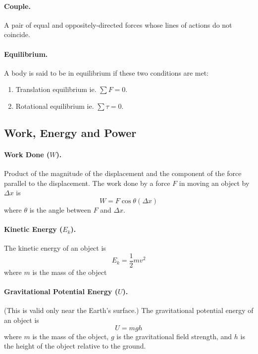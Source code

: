 \documentclass{article}
\begin{document}
\paragraph{Couple.} A pair of equal and oppositely-directed forces whose lines
of actions do not coincide.

\paragraph{Equilibrium.} A body is said to be in equilibrium if these two
conditions are met:

\begin{enumerate} \item Translation equilibrium ie. $\sum F = 0$.  \item
Rotational equilibrium ie. $\sum \tau = 0$.  \end{enumerate}

\subsection{Work, Energy and Power}

\paragraph{Work Done ($W$).} Product of the magnitude of the displacement and
the component of the force parallel to the displacement. The work done by a
force $F$ in moving an object by $\Delta x$ is \begin{equation} W =
  F\cos\theta(\Delta x) \end{equation} where $\theta$ is the angle between $F$
  and $\Delta x$.

\paragraph{Kinetic Energy ($E_k$).} The kinetic energy of an object is
\begin{equation} E_k = \frac{1}{2}mv^2 \end{equation} where $m$ is the mass of
  the object

\paragraph{Gravitational Potential Energy ($U$).} (This is valid only near the
Earth's surface.) The gravitational potential energy of an object is
\begin{equation} U = mgh \end{equation} where $m$ is the mass of the object, $g$
  is the gravitational field strength, and $h$ is the height of the object
  relative to the ground.
\end{document}
